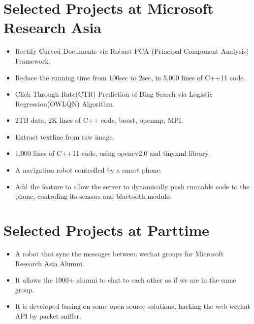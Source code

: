 \documentclass{resume}
\begin{document}
\section{Selected Projects at Microsoft Research Asia}
 \begin{itemize}
    \item Rectify Curved Documents via Robust PCA (Principal Component Analysis) Framework.
    \item Reduce the running time from 100sec to 2sec, in 5,000 lines of C++11 code.
 \end{itemize}

 \begin{itemize}
    \item Click Through Rate(CTR) Prediction of Bing Search via Logistic Regression(OWLQN) Algorithm.
    \item 2TB data, 2K lines of C++ code, boost, openmp, MPI.
 \end{itemize}

 \begin{itemize}
    \item Extract textline from raw image.
    \item 1,000 lines of C++11 code, using opencv2.0 and tinyxml library.
 \end{itemize}

 \begin{itemize}
    \item A navigation robot controlled by a smart phone.
    \item Add the feature to allow the server to dynamically push runnable code to the phone,
        controling its sensors and bluetooth modulo.
 \end{itemize}

\section{Selected Projects at Parttime}
 \begin{itemize}
    \item A robot that sync the messages between wechat groups for Microsoft Research Asia Alumni.
    \item It allows the 1000+ alumni to chat to each other as if we are in the same group.
    \item It is developed basing on some open source solutions, hacking the web wechat API by packet sniffer.
 \end{itemize}
\end{document}
